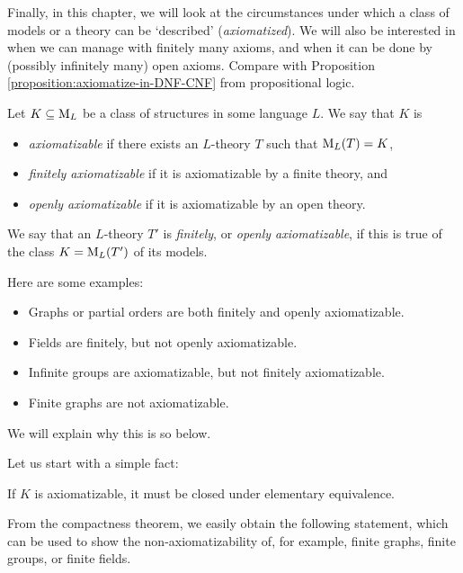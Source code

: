 Finally, in this chapter, we will look at the circumstances under which a class of models or a theory can be `described' (\emph{axiomatized}). We will also be interested in when we can manage with finitely many axioms, and when it can be done by (possibly infinitely many) open axioms. Compare with Proposition \ref{proposition:axiomatize-in-DNF-CNF} from propositional logic.

\begin{definition}[Axiomatizability]
Let $K \subseteq \operatorname{M}_L$ be a class of structures in some language $L$. We say that $K$ is
\begin{itemize}
    \item \emph{axiomatizable} if there exists an $L$-theory $T$ such that $\operatorname{M}_L(T)=K$,
    \item \emph{finitely axiomatizable} if it is axiomatizable by a finite theory, and
    \item \emph{openly axiomatizable} if it is axiomatizable by an open theory.
\end{itemize}
We say that an $L$-theory $T'$ is \emph{finitely}, or \emph{openly axiomatizable}, if this is true of the class $K=\operatorname{M}_L(T')$ of its models.
\end{definition}

\begin{example}
    Here are some examples:
    \begin{itemize}
        \item Graphs or partial orders are both finitely and openly axiomatizable.
        \item Fields are finitely, but not openly axiomatizable.
        \item Infinite groups are axiomatizable, but not finitely axiomatizable.
        \item Finite graphs are not axiomatizable.
    \end{itemize}
    We will explain why this is so below.
\end{example}

Let us start with a simple fact:

\begin{observation}
    If $K$ is axiomatizable, it must be closed under elementary equivalence.  
\end{observation}

From the compactness theorem, we easily obtain the following statement, which can be used to show the non-axiomatizability of, for example, finite graphs, finite groups, or finite fields.

